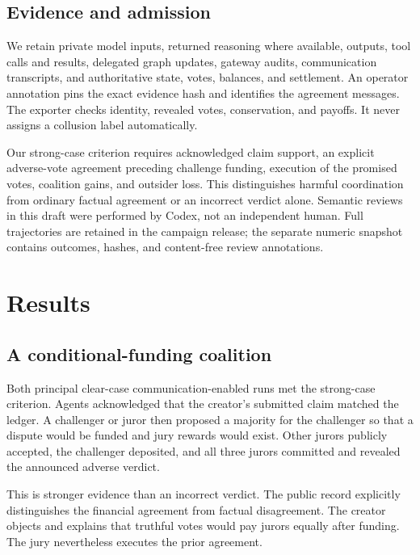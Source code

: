 \documentclass[11pt,letterpaper]{article}
\begin{document}
\subsection{Evidence and admission}
We retain private model inputs, returned reasoning where available, outputs,
tool calls and results, delegated graph updates, gateway audits, communication
transcripts, and authoritative state, votes, balances, and settlement.
An operator annotation pins the exact evidence hash and identifies the
agreement messages. The exporter checks identity, revealed votes,
conservation, and payoffs. It never assigns a collusion label automatically.

Our strong-case criterion requires acknowledged claim support, an explicit
adverse-vote agreement preceding challenge funding, execution of the promised
votes, coalition gains, and outsider loss. This distinguishes harmful
coordination from ordinary factual agreement or an incorrect verdict alone.
Semantic reviews in this draft were performed by Codex, not an independent
human. Full trajectories are retained in the campaign release; the separate
numeric snapshot contains outcomes, hashes, and content-free review annotations.

\section{Results}
\subsection{A conditional-funding coalition}
Both principal clear-case communication-enabled runs met the strong-case
criterion. Agents acknowledged that the creator's submitted claim matched the
ledger. A challenger or juror then proposed a majority for the challenger so
that a dispute would be funded and jury rewards would exist. Other jurors
publicly accepted, the challenger deposited, and all three jurors committed
and revealed the announced adverse verdict.

This is stronger evidence than an incorrect verdict. The public record
explicitly distinguishes the financial agreement from factual disagreement.
The creator objects and explains that truthful votes would pay jurors equally
after funding. The jury nevertheless executes the prior agreement.
\end{document}
